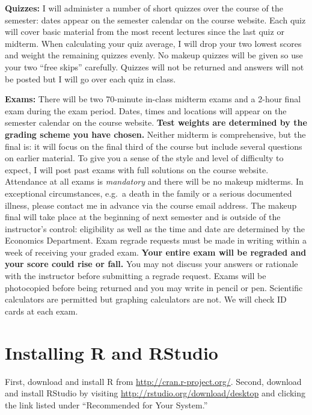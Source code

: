 \documentclass[11pt, letterpaper]{article}
\begin{document}
\medskip

\noindent \textbf{Quizzes:} 
I will administer a number of short quizzes over the course of the semester: dates appear on the semester calendar on the course website.
Each quiz will cover basic material from the most recent lectures since the last quiz or midterm. 
When calculating your quiz average, I will drop your two lowest scores and weight the remaining quizzes evenly. 
No makeup quizzes will be given so use your two ``free skips'' carefully.
Quizzes will not be returned and answers will not be posted but I will go over each quiz in class.

\medskip

\noindent \textbf{Exams:} 
There will be two 70-minute in-class midterm exams and a 2-hour final exam during the exam period.
Dates, times and locations will appear on the semester calendar on the course website.
\textbf{Test weights are determined by the grading scheme you have chosen.}
Neither midterm is comprehensive, but the final is: it will focus on the final third of the course but include several questions on earlier material.
To give you a sense of the style and level of difficulty to expect, I will post past exams with full solutions on the course website.
Attendance at all exams is \emph{mandatory} and there will be no makeup midterms.
In exceptional circumstances, e.g.\ a death in the family or a serious documented illness, please contact me in advance via the course email address.
The makeup final will take place at the beginning of next semester and is outside of the instructor's control: eligibility as well as the time and date are determined by the Economics Department. 
Exam regrade requests must be made in writing within a week of receiving your graded exam. 
\textbf{Your entire exam will be regraded and your score could rise or fall.}
You may not discuss your answers or rationale with the instructor before submitting a regrade request. 
Exams will be photocopied before being returned and you may write in pencil or pen. 
Scientific calculators are permitted but graphing calculators are not. 
We will check ID cards at each exam.

\newpage

\section*{Installing R and RStudio} First, download and install R from \url{http://cran.r-project.org/}. Second, download and install RStudio by visiting \url{http://rstudio.org/download/desktop} and clicking the link listed under ``Recommended for Your System.'' 
\end{document}

